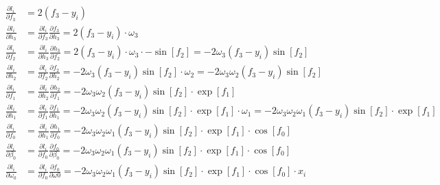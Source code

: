 \documentclass{article}
\begin{document}
\begin{align*}
\frac{\partial{l_{i}}}{\partial{f_{3}}} &= 2(f_{3}- y_{i}) \\
\frac{\partial{l_{i}}}{\partial{h_{3}}} &= \frac{\partial{l_{i}}}{\partial{f_{3}}} \frac{\partial{f_{3}}}{\partial{h_{3}}} = 2(f_{3}- y_{i}) \cdot \omega_{3} \\
\frac{\partial{l_{i}}}{\partial{f_{2}}} &= \frac{\partial{l_{i}}}{\partial{h_{3}}} \frac{\partial{h_{3}}}{\partial{f_{2}}} = 2(f_{3}- y_{i}) \cdot \omega_{3} \cdot - \sin[f_{2}] = - 2 \omega_{3} (f_{3}- y_{i}) \sin[f_{2}] \\
\frac{\partial{l_{i}}}{\partial{h_{2}}} &= \frac{\partial{l_{i}}}{\partial{f_{2}}} \frac{\partial{f_{2}}}{\partial{h_{2}}} = - 2 \omega_{3} (f_{3}- y_{i}) \sin[f_{2}] \cdot \omega_{2} = - 2 \omega_{3} \omega_{2} (f_{3}- y_{i}) \sin[f_{2}] \\
\frac{\partial{l_{i}}}{\partial{f_{1}}} &= \frac{\partial{l_{i}}}{\partial{h_{2}}} \frac{\partial{h_{2}}}{\partial{f_{1}}} = - 2 \omega_{3} \omega_{2} (f_{3}- y_{i}) \sin[f_{2}] \cdot \exp[f_{1}] \\
\frac{\partial{l_{i}}}{\partial{h_{1}}} &= \frac{\partial{l_{i}}}{\partial{f_{1}}} \frac{\partial{f_{1}}}{\partial{h_{1}}} = - 2 \omega_{3} \omega_{2} (f_{3}- y_{i}) \sin[f_{2}] \cdot \exp[f_{1}] \cdot \omega_{1} = - 2 \omega_{3} \omega_{2} \omega_{1} (f_{3}- y_{i}) \sin[f_{2}] \cdot \exp[f_{1}] \\
\frac{\partial{l_{i}}}{\partial{f_{0}}} &= \frac{\partial{l_{i}}}{\partial{h_{1}}} \frac{\partial{h_{1}}}{\partial{f_{0}}} = - 2 \omega_{3} \omega_{2} \omega_{1} (f_{3}- y_{i}) \sin[f_{2}] \cdot \exp[f_{1}] \cdot \cos[f_{0}] \\
\frac{\partial{l_{i}}}{\partial{\beta_{0}}} &= \frac{\partial{l_{i}}}{\partial{f_{0}}} \frac{\partial{f_{0}}}{\partial{\beta_{0}}} = - 2 \omega_{3} \omega_{2} \omega_{1} (f_{3}- y_{i}) \sin[f_{2}] \cdot \exp[f_{1}] \cdot \cos[f_{0}] \\
\frac{\partial{l_{i}}}{\partial{\omega_{0}}} &= \frac{\partial{l_{i}}}{\partial{f_{0}}} \frac{\partial{f_{0}}}{\partial{\omega{0}}} = - 2 \omega_{3} \omega_{2} \omega_{1} (f_{3}- y_{i}) \sin[f_{2}] \cdot \exp[f_{1}] \cdot \cos[f_{0}] \cdot x_{i}
\end{align*}
\end{document}
